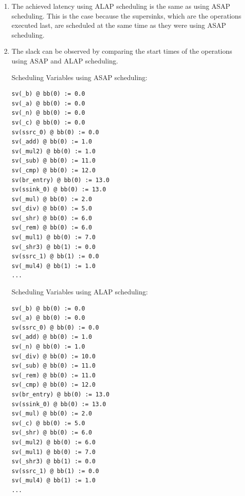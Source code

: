 \documentclass{article}
\begin{document}
    \begin{enumerate}
        \item The achieved latency using ALAP scheduling is the same as using ASAP scheduling. This is the case because the supersinks, which are the operations executed last, are scheduled at the same time as they were using ASAP scheduling.
        \item The slack can be observed by comparing the start times of the operations using ASAP and ALAP scheduling.

        
        \begin{minipage}[t]{90mm}
        Scheduling Variables using ASAP scheduling:
            \begin{verbatim}
sv(_b) @ bb(0) := 0.0
sv(_a) @ bb(0) := 0.0
sv(_n) @ bb(0) := 0.0
sv(_c) @ bb(0) := 0.0
sv(ssrc_0) @ bb(0) := 0.0
sv(_add) @ bb(0) := 1.0
sv(_mul2) @ bb(0) := 1.0
sv(_sub) @ bb(0) := 11.0
sv(_cmp) @ bb(0) := 12.0
sv(br_entry) @ bb(0) := 13.0
sv(ssink_0) @ bb(0) := 13.0
sv(_mul) @ bb(0) := 2.0
sv(_div) @ bb(0) := 5.0
sv(_shr) @ bb(0) := 6.0
sv(_rem) @ bb(0) := 6.0
sv(_mul1) @ bb(0) := 7.0
sv(_shr3) @ bb(1) := 0.0
sv(ssrc_1) @ bb(1) := 0.0
sv(_mul4) @ bb(1) := 1.0
...
            \end{verbatim}
        \end{minipage}
        \begin{minipage}[t]{90mm}
        Scheduling Variables using ALAP scheduling:
            \begin{verbatim}
sv(_b) @ bb(0) := 0.0
sv(_a) @ bb(0) := 0.0
sv(ssrc_0) @ bb(0) := 0.0
sv(_add) @ bb(0) := 1.0
sv(_n) @ bb(0) := 1.0
sv(_div) @ bb(0) := 10.0
sv(_sub) @ bb(0) := 11.0
sv(_rem) @ bb(0) := 11.0
sv(_cmp) @ bb(0) := 12.0
sv(br_entry) @ bb(0) := 13.0
sv(ssink_0) @ bb(0) := 13.0
sv(_mul) @ bb(0) := 2.0
sv(_c) @ bb(0) := 5.0
sv(_shr) @ bb(0) := 6.0
sv(_mul2) @ bb(0) := 6.0
sv(_mul1) @ bb(0) := 7.0
sv(_shr3) @ bb(1) := 0.0
sv(ssrc_1) @ bb(1) := 0.0
sv(_mul4) @ bb(1) := 1.0
...
            \end{verbatim}
        \end{minipage}


\end{enumerate}
\end{document}
